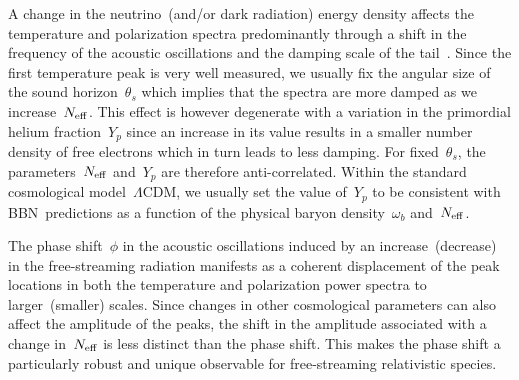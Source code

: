 A change in the neutrino~(and/or dark radiation) energy density affects the temperature and polarization spectra predominantly through a shift in the frequency of the acoustic oscillations and the damping scale of the tail~\cite{Hou:2011ec}. Since the first temperature peak is very well measured, we usually fix the angular size of the sound horizon~$\theta_s$ which implies that the spectra are more damped as we increase~$N_\mathrm{eff}$. This effect is however degenerate with a variation in the primordial helium fraction~$Y_p$ since an increase in its value results in a smaller number density of free electrons which in turn leads to less damping. For fixed~$\theta_s$, the parameters~$N_\mathrm{eff}$ and~$Y_p$ are therefore anti-correlated. Within the standard cosmological model~$\Lambda$CDM, we usually set the value of~$Y_p$ to be consistent with BBN~predictions as a function of the physical baryon density~$\omega_b$ and~$N_\mathrm{eff}$.

The phase shift~$\phi$ in the acoustic oscillations induced by an increase~(decrease) in the free-streaming radiation manifests as a coherent displacement of the peak locations in both the temperature and polarization power spectra to larger~(smaller) scales. Since changes in other cosmological parameters can also affect the amplitude of the peaks, the shift in the amplitude associated with a change in~$N_\mathrm{eff}$ is less distinct than the phase shift. This makes the phase shift a particularly robust and unique observable for free-streaming relativistic species.\medskip

